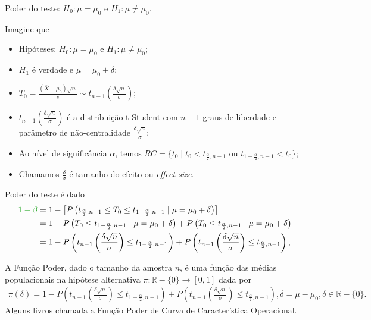 \documentclass[8pt]{beamer}
\begin{document}
\begin{frame}{Poder do teste: $H_0:\mu = \mu_0$ e $H_1: \mu \neq \mu_0$.}

\scriptsize

Imagine que
\begin{itemize}
	\item Hipóteses: $H_0: \mu = \mu_0$ e $H_1: \mu \neq \mu_0$;
	\item $H_1$ é verdade e $\mu = \mu_0 + \delta$;
	\item $T_0 = \frac{(\bar{X} - \mu_0)\sqrt{n}}{s}  \sim t_{n-1}\left( \frac{\delta \sqrt{n}}{\sigma} \right)$;
	\item $t_{n-1}\left(\frac{\delta\sqrt{n}}{\sigma}\right)$ é  a distribuição t-Student com $n-1$ graus de liberdade e parâmetro de não-centralidade $\frac{\delta \sqrt{n}}{\sigma}$;
	\item Ao nível de significância $\alpha$, temos $RC = \{ t_0 \mid t_0 < t_{\frac{\alpha}{2}, n-1} \mbox{ ou } t_{1-\frac{\alpha}{2}, n-1} < t_0   \}$;
	\item Chamamos $\frac{\delta}{\sigma}$ é tamanho do efeito ou \textit{effect size}.
\end{itemize}
\vfill	

Poder do teste é dado
\begin{align*}
\textcolor{important}{1-\beta} &=1 - \left[P\left( t_{\frac{\alpha}{2}, n-1} \leq T_0 \leq t_{1-\frac{\alpha}{2}, n-1} \mid \mu = \mu_0 + \delta \right)\right]  \\
&= 1- P\left( T_0 \leq t_{1-\frac{\alpha}{2}, n-1} \mid \mu = \mu_0 + \delta \right) + P\left( T_0 \leq t_{\frac{\alpha}{2}, n-1} \mid \mu = \mu_0 + \delta \right)\\
&= 1 - P\left( t_{n-1}\left(\frac{\delta\sqrt{n}}{\sigma}\right) \leq t_{1-\frac{\alpha}{2}, n-1} \right) + P\left( t_{n-1}\left(\frac{\delta\sqrt{n}}{\sigma}\right) \leq t_{\frac{\alpha}{2}, n-1} \right),
\end{align*}
\vfill

A \textcolor{important}{Função Poder}, dado o tamanho da amostra $n$, é uma função das médias populacionais na hipótese alternativa  $\pi: \mathbb{R}-\{0\} \longrightarrow [0,1]$ dada por
\begin{align*}
\pi(\delta) =  1 - P\left( t_{n-1}\left(\frac{\delta\sqrt{n}}{\sigma}\right) \leq t_{1-\frac{\alpha}{2}, n-1} \right) + P\left( t_{n-1}\left(\frac{\delta\sqrt{n}}{\sigma}\right) \leq t_{\frac{\alpha}{2}, n-1} \right), \delta = \mu - \mu_0, \delta \in \mathbb{R} - \{0 \}.
\end{align*}
Alguns livros chamada a Função Poder de \textcolor{important}{Curva de Característica Operacional.}

\normalsize	
\end{frame}
\end{document}
